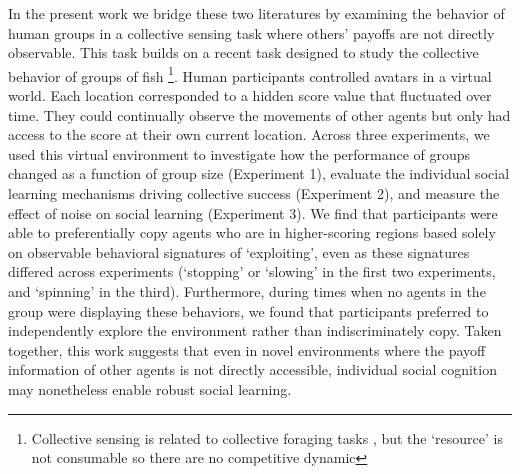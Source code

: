 \documentclass[12pt,letterpaper]{article}
\begin{document}
In the present work we bridge these two literatures by examining the behavior of human groups in a collective sensing task where others' payoffs are not directly observable.  
This task builds on a recent task designed to study the collective behavior of groups of fish \cite{berdahl_emergent_2013}\footnote{Collective sensing is related to  collective foraging tasks \cite{dechaume2005hidden,goldstone2005knowledge},  but the ‘resource’ is not consumable so there are no competitive dynamic}.
Human participants controlled avatars in a virtual world.
Each location corresponded to a hidden score value that fluctuated over time.
They could continually observe the movements of other agents but only had access to the score at their own current location. 
Across three experiments, we used this virtual environment to investigate how the performance of groups changed as a function of group size (Experiment 1), evaluate the individual social learning mechanisms driving collective success (Experiment 2), and measure the effect of noise on social learning (Experiment 3).
We find that participants were able to preferentially copy agents who are in higher-scoring regions based solely on observable behavioral signatures of `exploiting', even as these signatures differed across experiments (`stopping' or `slowing' in the first two experiments, and `spinning' in the third). 
Furthermore, during times when no agents in the group were displaying these behaviors, we found that participants preferred to independently explore the environment rather than indiscriminately copy.
Taken together, this work suggests that even in novel environments where the payoff information of other agents is not directly accessible, individual social cognition may nonetheless enable robust social learning. 
\end{document}
